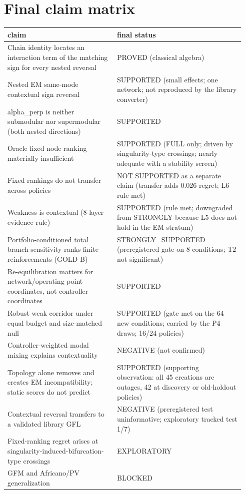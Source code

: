 \documentclass[10pt,a4paper]{article}
\begin{document}
\section{Final claim matrix}
{\small
\begin{longtable}{L{0.439\linewidth}L{0.501\linewidth}}
\toprule
\textbf{claim} & \textbf{final status} \\
\midrule
\endhead
Chain identity locates an interaction term of the matching sign for every nested reversal & PROVED (classical algebra) \\
Nested EM same-mode contextual sign reversal & SUPPORTED (small effects; one network; not reproduced by the library converter) \\
alpha\_perp is neither submodular nor supermodular (both nested directions) & SUPPORTED \\
Oracle fixed node ranking materially insufficient & SUPPORTED (FULL only; driven by singularity-type crossings; nearly adequate with a stability screen) \\
Fixed rankings do not transfer across policies & NOT SUPPORTED as a separate claim (transfer adds 0.026 regret; L6 rule met) \\
Weakness is contextual (8-layer evidence rule) & SUPPORTED (rule met; downgraded from STRONGLY because L5 does not hold in the EM stratum) \\
Portfolio-conditioned total branch sensitivity ranks finite reinforcements (GOLD-B) & STRONGLY\_SUPPORTED (preregistered gate on 8 conditions; T2 not significant) \\
Re-equilibration matters for network/operating-point coordinates, not controller coordinates & SUPPORTED \\
Robust weak corridor under equal budget and size-matched null & SUPPORTED (gate met on the 64 new conditions; carried by the P4 draws; 16/24 policies) \\
Controller-weighted modal mixing explains contextuality & NEGATIVE (not confirmed) \\
Topology alone removes and creates EM incompatibility; static scores do not predict & SUPPORTED (supporting observation: all 45 creations are outages, 42 at discovery or old-holdout policies) \\
Contextual reversal transfers to a validated library GFL & NEGATIVE (preregistered test uninformative; exploratory tracked test 1/7) \\
Fixed-ranking regret arises at singularity-induced-bifurcation-type crossings & EXPLORATORY \\
GFM and Africano/PV generalization & BLOCKED \\
\bottomrule
\end{longtable}}
\end{document}
